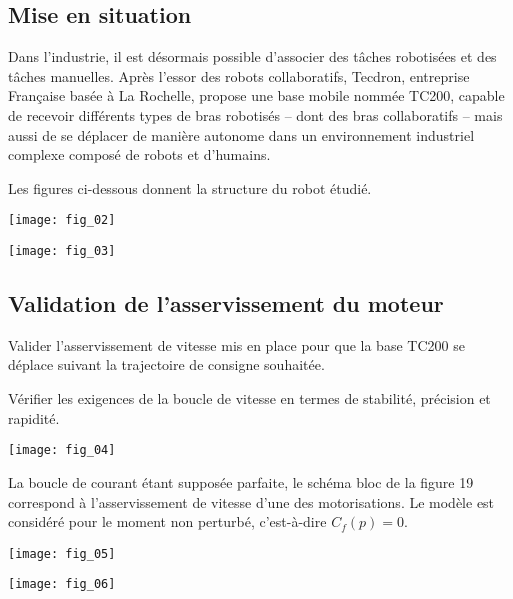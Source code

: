\ifprof
\else
\begin{multicols}{2}
\fi


\setcounter{numques}{0}
\subsection*{Mise en situation}

Dans l’industrie, il est désormais possible d’associer des tâches robotisées et des tâches manuelles. Après l’essor
des robots collaboratifs, Tecdron, entreprise Française basée à La Rochelle, propose une base mobile nommée
TC200, capable de recevoir différents types de bras robotisés -- dont des bras collaboratifs -- mais aussi de
se déplacer de manière autonome dans un environnement industriel complexe composé de robots et d’humains.

Les figures ci-dessous donnent la structure du robot étudié. 

\begin{center}
\texttt{[image: fig\_02]}

\texttt{[image: fig\_03]}
\end{center}


\subsection*{Validation de l'asservissement du moteur}
\begin{obj}
Valider l’asservissement de vitesse mis en place pour que la base TC200 se déplace suivant la trajectoire
de consigne souhaitée.

Vérifier les exigences de la boucle de vitesse en termes de stabilité, précision et rapidité.
\end{obj}



\begin{center}
\texttt{[image: fig\_04]}
\end{center}

La boucle de courant étant supposée parfaite, le schéma bloc de la figure 19 correspond à l’asservissement de
vitesse d’une des motorisations. Le modèle est considéré pour le moment non perturbé, c’est-à-dire $C_f(p)=0$.

\begin{center}
\texttt{[image: fig\_05]}
\end{center}


\begin{center}
\texttt{[image: fig\_06]}
\end{center}


\end{multicols}
